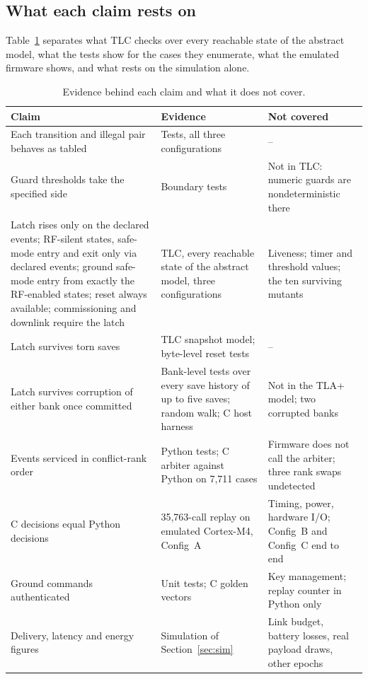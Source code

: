 \documentclass[preprint,12pt]{elsarticle}
\newcommand{\cfgA}{Config~A}
\newcommand{\cfgB}{Config~B}
\newcommand{\cfgC}{Config~C}
\begin{document}
\subsection{What each claim rests on}

Table~\ref{tab:scope} separates what TLC checks over every reachable state of the abstract model, what the tests show for the cases they enumerate, what the emulated firmware shows, and what rests on the simulation alone.

\begin{table}[t]
\centering
\footnotesize
\caption{Evidence behind each claim and what it does not cover.}
\label{tab:scope}
\begin{tabular}{@{}p{}p{}p{}@{}}
\toprule
Claim & Evidence & Not covered \\
\midrule
Each transition and illegal pair behaves as tabled & Tests, all three configurations & -- \\
Guard thresholds take the specified side & Boundary tests & Not in TLC: numeric guards are nondeterministic there \\
Latch rises only on the declared events; RF-silent states, safe-mode entry and exit only via declared events; ground safe-mode entry from exactly the RF-enabled states; reset always available; commissioning and downlink require the latch & TLC, every reachable state of the abstract model, three configurations & Liveness; timer and threshold values; the ten surviving mutants \\
Latch survives torn saves & TLC snapshot model; byte-level reset tests & -- \\
Latch survives corruption of either bank once committed & Bank-level tests over every save history of up to five saves; random walk; C host harness & Not in the TLA+ model; two corrupted banks \\
Events serviced in conflict-rank order & Python tests; C arbiter against Python on 7,711 cases & Firmware does not call the arbiter; three rank swaps undetected \\
C decisions equal Python decisions & 35,763-call replay on emulated Cortex-M4, \cfgA{} & Timing, power, hardware I/O; \cfgB{} and \cfgC{} end to end \\
Ground commands authenticated & Unit tests; C golden vectors & Key management; replay counter in Python only \\
Delivery, latency and energy figures & Simulation of Section~\ref{sec:sim} & Link budget, battery losses, real payload draws, other epochs \\
\bottomrule
\end{tabular}
\end{table}
\end{document}
